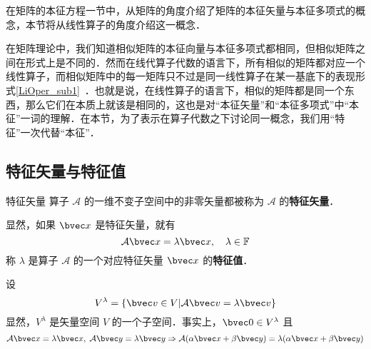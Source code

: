 在矩阵的本征方程一节中，从矩阵的角度介绍了矩阵的本征矢量与本征多项式的概念，本节将从线性算子的角度介绍这一概念．

在矩阵理论中，我们知道相似矩阵的本征向量与本征多项式都相同，但相似矩阵之间在形式上是不同的．然而在线代算子代数的语言下，所有相似的矩阵都对应一个线性算子，而相似矩阵中的每一矩阵只不过是同一线性算子在某一基底下的表现形式\autoref{LiOper_sub1}~．也就是说，在线性算子的语言下，相似的矩阵都是同一个东西，那么它们在本质上就该是相同的，这也是对“本征矢量”和“本征多项式”中“本征”一词的理解．在本节，为了表示在算子代数之下讨论同一概念，我们用“特征”一次代替“本征”．
\subsection{特征矢量与特征值}
\begin{definition}{特征矢量}
算子 $\mathcal{A}$ 的一维不变子空间中的非零矢量都被称为 $\mathcal{A}$ 的\textbf{特征矢量}．
\end{definition}
显然，如果 $\bvec x$ 是特征矢量，就有
\begin{equation}
\mathcal{A}\bvec x=\lambda \bvec x,\quad \lambda\in\mathbb{F}
\end{equation}
称 $\lambda$ 是算子 $\mathcal{A}$ 的一个对应特征矢量 $\bvec x$ 的\textbf{特征值}．

设
\begin{equation}
V^{\lambda}=\{\bvec v\in V|\mathcal{A}\bvec v=\lambda \bvec v\}
\end{equation}
显然，$V^{\lambda}$ 是矢量空间 $V$ 的一个子空间．事实上，$\bvec 0\in V^{\lambda}$ 且
\begin{equation}
\mathcal{A}\bvec x=\lambda \bvec x,\;\mathcal{A}\bvec y=\lambda \bvec y\Rightarrow\mathcal{A}(\alpha\bvec x+\beta\bvec y)=\lambda(\alpha\bvec x+\beta \bvec y)
\end{equation}
